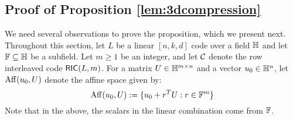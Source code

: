 \begin{comment}
\subsection{Proof of Lemma~\ref{lem:bicdecoding} }\label{prooflemmaRScode}
\begin{proof}
	Let $U_1 \in \mc{C}_1$  such that $\dham_1(U^\ast, U_1) \leq \dham(U^\ast, U) \forall U\in \mc{C}_1$ and let $\dham_1(U^\ast, U_1) = \beta_1$ with $\beta_1<e_1$
	Therefore $U^\ast$ differs from $U_1$ in $\beta_1$ many columns, i.e. in the remaining $n-\beta_1$ columns $U^\ast$ and $U_1$ are identical.
	So, there are columns $S_1 = \{j_{s} : s\in [n - \beta_1] \}$ for which $U^\ast[i,j] = U_1[i,j]$ $\forall j\in S$.
	Let $U_2 \in \mc{C}_2$  such that $\dham_2(U^\ast, U_2) \leq \dham(U^\ast, U) \forall U\in \mc{C}_2$ and let $\dham_1(U^\ast, U_2) = \beta_2$ with $\beta_2<e_2$
	Therefore $U^\ast$ differs from $U_2$ in $\beta_2$ many rows, i.e. in the remaining $n-\beta_1$ rows $U^\ast$ and $U_2$ are identical.
	So, there are rows $S_2 = \{i_{t} : t\in [h - \beta_2] \}$ for which $U^\ast[i,j] = U_2[i,j]$ $\forall i\in T$.
	
	$U_1\in \mc{C}_1 \implies \exists$ polynomials $p_1(\cdot), \ldots, p_h(\cdot)$ of degree $< \ell$
	
	$U_2\in \mc{C}_2 \implies \exists$ polynomials $q_1(\cdot), \ldots, q_n(\cdot)$ of degree $< m$
	
	Such that $p_i(\eta_j) = U_1[i,j] $ and $ q_i(\alpha_j) = U_2[j,i]$
	
	Therefore, $U_1[i,j] = U_2[i,j]$ $\forall i\in S_1, j\in S_2$. Choose a bivariate polynomial $Q(x,y)$ such that $deg_x(Q)<\ell $ and $deg_y(Q)<m$ and $Q(\eta_{i_s}, \alpha_{j_t}) = U_1[i_s,j_t] = U_2[i_s,j_t] \forall (i, j)\in S_1\times S_2$. 
	
	Defne $U = Q(\eta_i,\alpha_j)$ $\forall i\in[h], j\in[n]$, Then $U \in L_1\otimes L_2$ and $U^\ast[i,j] = U[i,j]$ $\forall (i,j) \in S_1 \times S_2$.
	
	And $|S_1|= n-\beta_1 > n-e_1$ and $|S_2|= h-\beta_2 > h-e_2$.
	This proves the above claim.	
\end{proof}
\end{comment}

\subsection{Proof of Proposition \ref{lem:3dcompression}} \label{app:ProofofLem3dcompression}
We need several observations to prove the proposition, which we present next.
Throughout this section, let $L$ be a linear $[n,k,d]$ code over a field $\mathbb{H}$ and let $\mathbb{F}\subseteq \mathbb{H}$ be a subfield.  Let $m\geq 1$ be an integer, and let $\mathcal{C}$ denote the row interleaved code $\mathsf{RIC}(L,m)$. For a matrix $U\in \mathbb{H}^{m\times n}$ and a vector $u_0\in \mathbb{H}^n$, let ${\rm Aff}({u_0},{U})$ denote the affine space given by:
\begin{equation}\label{eq:affspace}
\aff{u_0}{U} := \{u_0+r^TU: r\in \FF^m\}
\end{equation}
Note that in the above, the scalars in the linear combination come from $\mathbb{F}$.

